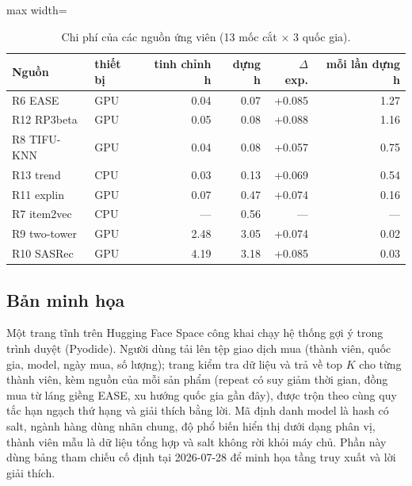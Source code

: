 \documentclass[jtehm]{ieeeaccess}
\begin{document}
\begin{table}[t]
\caption{Chi phí của các nguồn ứng viên (13 mốc cắt $\times$ 3 quốc gia).}
\label{tab:cost}
\setlength{\tabcolsep}{3pt}
\centering
\begin{adjustbox}{max width=\columnwidth}
\begin{tabular}{llrrrr}
\toprule
Nguồn & thiết bị & tinh chỉnh h & dựng h & $\Delta$ exp. & mỗi lần dựng h \\
\midrule
R6 EASE       & GPU & 0.04 & 0.07 & +0.085 & 1.27 \\
R12 RP3beta   & GPU & 0.05 & 0.08 & +0.088 & 1.16 \\
R8 TIFU-KNN   & GPU & 0.04 & 0.08 & +0.057 & 0.75 \\
R13 trend     & CPU & 0.03 & 0.13 & +0.069 & 0.54 \\
R11 explin    & GPU & 0.07 & 0.47 & +0.074 & 0.16 \\
R7 item2vec   & CPU & ---  & 0.56 & ---    & --- \\
R9 two-tower  & GPU & 2.48 & 3.05 & +0.074 & 0.02 \\
R10 SASRec    & GPU & 4.19 & 3.18 & +0.085 & 0.03 \\
\bottomrule
\end{tabular}
\end{adjustbox}
\end{table}

\subsection{Bản minh họa}
Một trang tĩnh trên Hugging Face Space công khai chạy hệ thống gợi ý trong trình duyệt (Pyodide). Người dùng tải lên tệp giao dịch mua (thành viên, quốc gia, model, ngày mua, số lượng); trang kiểm tra dữ liệu và trả về top $K$ cho từng thành viên, kèm nguồn của mỗi sản phẩm (repeat có suy giảm thời gian, đồng mua từ láng giềng EASE, xu hướng quốc gia gần đây), được trộn theo cùng quy tắc hạn ngạch thứ hạng và giải thích bằng lời. Mã định danh model là hash có salt, ngành hàng dùng nhãn chung, độ phổ biến hiển thị dưới dạng phân vị, thành viên mẫu là dữ liệu tổng hợp và salt không rời khỏi máy chủ. Phần này dùng bảng tham chiếu cố định tại 2026-07-28 để minh họa tầng truy xuất và lời giải thích.
\end{document}
